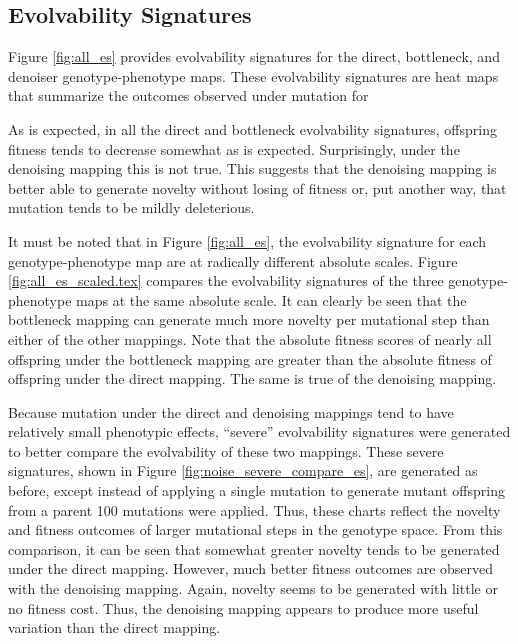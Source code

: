 \subsection{Evolvability Signatures}






Figure \ref{fig:all_es} provides evolvability signatures for the direct, bottleneck, and denoiser genotype-phenotype maps.
These evolvability signatures are heat maps that summarize the outcomes observed under mutation for

As is expected, in all the direct and bottleneck evolvability signatures, offspring fitness tends to decrease somewhat as is expected.
Surprisingly, under the denoising mapping this is not true.
This suggests that the denoising mapping is better able to generate novelty without losing of fitness or, put another way, that mutation tends to be mildly deleterious.

It must be noted that in Figure \ref{fig:all_es}, the evolvability signature for each genotype-phenotype map are at radically different absolute scales.
Figure \ref{fig:all_es_scaled.tex} compares the evolvability signatures of the three genotype-phenotype maps at the same absolute scale.
It can clearly be seen that the bottleneck mapping can generate much more novelty per mutational step than either of the other mappings.
Note that the absolute fitness scores of nearly all offspring under the bottleneck mapping are greater than the absolute fitness of offspring under the direct mapping.
The same is true of the denoising mapping.

Because mutation under the direct and denoising mappings tend to have relatively small phenotypic effects, ``severe'' evolvability signatures were generated to better compare the evolvability of these two mappings.
These severe signatures, shown in Figure \ref{fig:noise_severe_compare_es}, are generated as before, except instead of applying a single mutation to generate mutant offspring from a parent 100 mutations were applied.
Thus, these charts reflect the novelty and fitness outcomes of larger mutational steps in the genotype space.
From this comparison, it can be seen that somewhat greater novelty tends to be generated under the direct mapping.
However, much better fitness outcomes are observed with the denoising mapping.
Again, novelty seems to be generated with little or no fitness cost.
Thus, the denoising mapping appears to produce more useful variation than the direct mapping.


